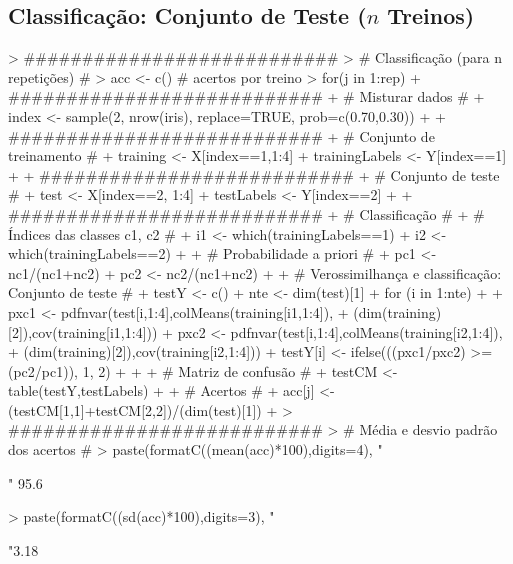 \documentclass{article}
\begin{document}
\subsection{Classificação: Conjunto de Teste ($n$ Treinos)}
\begin{Schunk}
\begin{Sinput}
> ###########################
> # Classificação (para n repetições) #
> acc <- c() # acertos por treino
> for(j in 1:rep){
+   ###########################
+   # Misturar dados #
+   index <- sample(2, nrow(iris), replace=TRUE, prob=c(0.70,0.30))
+   
+   ###########################
+   # Conjunto de treinamento #
+   training <- X[index==1,1:4]
+   trainingLabels <- Y[index==1]
+   
+   ###########################
+   # Conjunto de teste #
+   test <- X[index==2, 1:4]
+   testLabels <- Y[index==2]
+   
+   ###########################
+   # Classificação #
+   # Índices das classes c1, c2 #
+   i1 <- which(trainingLabels==1)
+   i2 <- which(trainingLabels==2)
+   
+   # Probabilidade a priori #
+   pc1 <- nc1/(nc1+nc2)
+   pc2 <- nc2/(nc1+nc2)
+   
+   # Verossimilhança e classificação: Conjunto de teste #
+   testY <- c()
+   nte <- dim(test)[1]
+   for (i in 1:nte)
+   {
+     pxc1 <- pdfnvar(test[i,1:4],colMeans(training[i1,1:4]),
+                     (dim(training)[2]),cov(training[i1,1:4]))
+     pxc2 <- pdfnvar(test[i,1:4],colMeans(training[i2,1:4]),
+                     (dim(training)[2]),cov(training[i2,1:4]))
+     testY[i] <- ifelse(((pxc1/pxc2) >= (pc2/pc1)), 1, 2)
+   }
+   
+   # Matriz de confusão #
+   testCM <- table(testY,testLabels)
+   
+   # Acertos #
+   acc[j] <- (testCM[1,1]+testCM[2,2])/(dim(test)[1])
+ }
> ###########################
> # Média e desvio padrão dos acertos #
> paste(formatC((mean(acc)*100),digits=4), "%
\end{Sinput}
\begin{Soutput}
[1] " 95.6%
\end{Soutput}
\begin{Sinput}
> paste(formatC((sd(acc)*100),digits=3), "%
\end{Sinput}
\begin{Soutput}
[1] "3.18%
\end{Soutput}
\end{Schunk}
\end{document}
